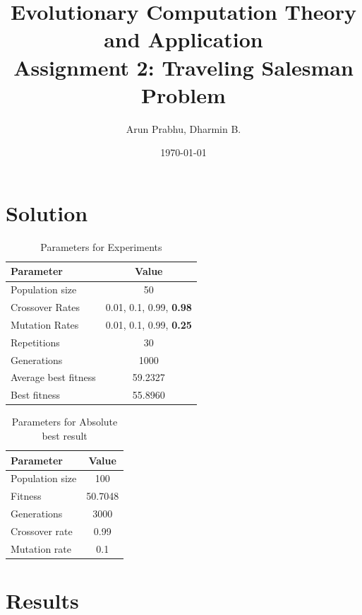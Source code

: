 \documentclass[a4paper, 12pt]{article}
\title{Evolutionary Computation Theory and Application  \\
				Assignment 2: Traveling Salesman Problem}
\author{Arun Prabhu, Dharmin B.}
\date{\today{}}
\begin{document}
\maketitle


\section{Solution}

\begin{table} [h!]
	  \centering
    \begin{tabular}{|l|c|}
    \hline
    \textbf{Parameter} & \textbf{Value}   \\\hline
    Population size & 50 \\\hline
    Crossover Rates &  0.01, 0.1, 0.99, \textbf{0.98}\\\hline
    Mutation Rates & 0.01, 0.1, 0.99, \textbf{0.25}\\\hline
    Repetitions & 30 \\\hline
    Generations & 1000 \\\hline
    Average best fitness		 & 59.2327 \\\hline
    Best fitness & 55.8960 \\\hline
    \end{tabular}
\caption{Parameters for Experiments}
\label{table:defparams}
\end{table}

\begin{table}[h!]
    \centering
    \label{tab:label}
    \begin{tabular}{|l|c|}\hline
        \textbf{Parameter} & \textbf{Value} \\\hline
        Population size & 100 \\\hline
        Fitness & 50.7048 \\\hline
        Generations & 3000 \\\hline
        Crossover rate & 0.99 \\\hline
        Mutation rate & 0.1 \\\hline
    \end{tabular}
    \caption{Parameters for Absolute best result}
\end{table}
\newpage
\section{Results}
\end{document}
